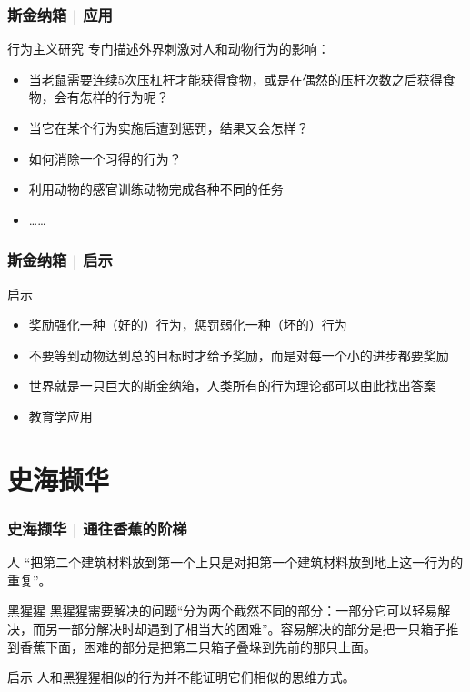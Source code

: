 \begin{frame}
  \frametitle{斯金纳箱 | 应用}
  \begin{block}{行为主义研究}
    专门描述外界刺激对人和动物行为的影响：
    \begin{itemize}
      \item 当老鼠需要连续5次压杠杆才能获得食物，或是在偶然的压杆次数之后获得食物，会有怎样的行为呢？
      \item 当它在某个行为实施后遭到惩罚，结果又会怎样？
      \item 如何消除一个习得的行为？
      \item 利用动物的感官训练动物完成各种不同的任务
      \item ……
    \end{itemize}
  \end{block}
\end{frame}

\begin{frame}
  \frametitle{斯金纳箱 | 启示}
  \begin{block}{启示}
    \begin{itemize}
      \item 奖励强化一种（好的）行为，惩罚弱化一种（坏的）行为
      \item 不要等到动物达到总的目标时才给予奖励，而是对每一个小的进步都要奖励
      \item 世界就是一只巨大的斯金纳箱，人类所有的行为理论都可以由此找出答案
      \item 教育学应用
    \end{itemize}
  \end{block}
\end{frame}

\section{史海撷华}
\begin{frame}
  \frametitle{史海撷华 | 通往香蕉的阶梯}
  \begin{block}{人}
    “把第二个建筑材料放到第一个上只是对把第一个建筑材料放到地上这一行为的重复”。
  \end{block}
  \pause
  \begin{block}{黑猩猩}
    黑猩猩需要解决的问题“分为两个截然不同的部分：一部分它可以轻易解决，而另一部分解决时却遇到了相当大的困难”。容易解决的部分是把一只箱子推到香蕉下面，困难的部分是把第二只箱子叠垛到先前的那只上面。
  \end{block}
  \pause
  \begin{block}{启示}
    人和黑猩猩相似的行为并不能证明它们相似的思维方式。
  \end{block}
\end{frame}

